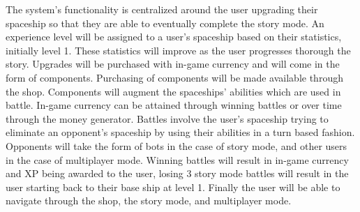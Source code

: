 \documentclass[]{article}
\begin{document}
The system's functionality is centralized around the user upgrading their spaceship so that they are able to eventually complete the story mode. An experience level will be assigned to a user's spaceship based on their statistics, initially level 1. These statistics will improve as the user progresses thorough the story. Upgrades will be purchased with in-game currency and will come in the form of components. Purchasing of components will be made available through the shop. Components will augment the spaceships' abilities which are used in battle. In-game currency can be attained through winning battles or over time through the money generator. Battles involve the user's spaceship trying to eliminate an opponent's spaceship by using their abilities in a turn based fashion. Opponents will take the form of bots  in the case of story mode, and other users in the case of multiplayer mode. Winning battles will result in in-game currency and XP being awarded to the user, losing 3 story mode battles will result in the user starting back to their base ship at level 1. Finally the user will be able to navigate through the shop, the story mode, and multiplayer mode.  

\end{document}
